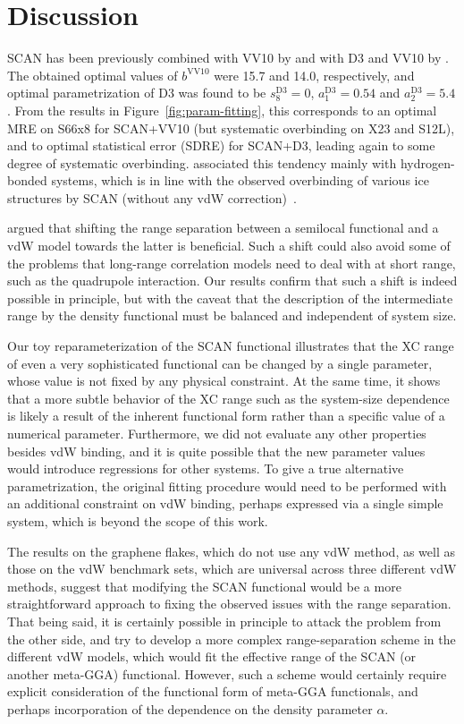 \section{Discussion}

SCAN has been previously combined with VV10 by \citet{PengPRX16} and with D3 and VV10 by \citet{BrandenburgPRB16}.
The obtained optimal values of $b^\text{VV10}$ were 15.7 and 14.0, respectively, and optimal parametrization of D3 was found to be $s_8^\text{D3}=0$, $a_1^\text{D3}=0.54$ and $a_2^\text{D3}=5.4$.
From the results in Figure~\ref{fig:param-fitting}, this corresponds to an optimal MRE on S66x8 for SCAN+VV10 (but systematic overbinding on X23 and S12L), and to optimal statistical error (SDRE) for SCAN+D3, leading again to some degree of systematic overbinding.
\citet{BrandenburgPRB16} associated this tendency mainly with hydrogen-bonded systems, which is in line with the observed overbinding of various ice structures by SCAN (without any vdW correction)~\cite{ChenPRB16}.

\citet{PengPRX16} argued that shifting the range separation between a semilocal functional and a vdW model towards the latter is beneficial.
Such a shift could also avoid some of the problems that long-range correlation models need to deal with at short range, such as the quadrupole interaction.
Our results confirm that such a shift is indeed possible in principle, but with the caveat that the description of the intermediate range by the density functional must be balanced and independent of system size.

Our toy reparameterization of the SCAN functional illustrates that the XC range of even a very sophisticated functional can be changed by a single parameter, whose value is not fixed by any physical constraint.
At the same time, it shows that a more subtle behavior of the XC range such as the system-size dependence is likely a result of the inherent functional form rather than a specific value of a numerical parameter.
Furthermore, we did not evaluate any other properties besides vdW binding, and it is quite possible that the new parameter values would introduce regressions for other systems.
To give a true alternative parametrization, the original fitting procedure would need to be performed with an additional constraint on vdW binding, perhaps expressed via a single simple system, which is beyond the scope of this work.

The results on the graphene flakes, which do not use any vdW method, as well as those on the vdW benchmark sets, which are universal across three different vdW methods, suggest that modifying the SCAN functional would be a more straightforward approach to fixing the observed issues with the range separation.
That being said, it is certainly possible in principle to attack the problem from the other side, and try to develop a more complex range-separation scheme in the different vdW models, which would fit the effective range of the SCAN (or another meta-GGA) functional.
However, such a scheme would certainly require explicit consideration of the functional form of meta-GGA functionals, and perhaps incorporation of the dependence on the density parameter $\alpha$.

